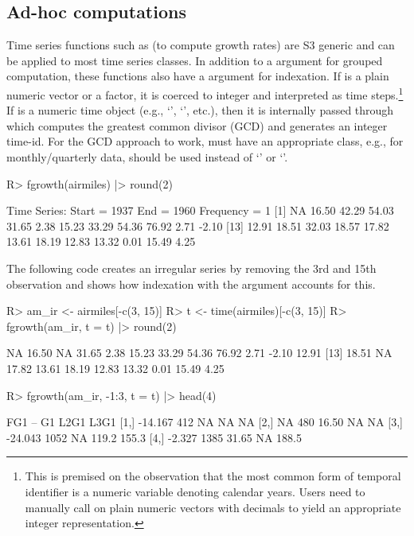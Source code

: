 \documentclass[nojss]{jss} %
\newcommand{\class}[1]{`\code{#1}'}
\newcommand{\fct}[1]{\code{#1()}}
\begin{document}
\subsection{Ad-hoc computations}
%
Time series functions such as \fct{fgrowth} (to compute growth rates) are S3 generic and can be applied to most time series classes. In addition to a  argument for grouped computation, these functions also have a  argument for indexation. If  is a plain numeric vector or a factor, it is coerced to integer and interpreted as time steps.\footnote{This is premised on the observation that the most common form of temporal identifier is a numeric variable denoting calendar years. Users need to manually call  on plain numeric vectors with decimals to yield an appropriate integer representation.} If  is a numeric time object (e.g., \class{Date}, \class{POSIXct}, etc.), then it is internally passed through  which computes the greatest common divisor (GCD) and generates an integer time-id. For the GCD approach to work,  must have an appropriate class, e.g., for monthly/quarterly data,  should be used instead of \class{Date} or \class{POSIXct}. %
%
\begin{Schunk}
\begin{Sinput}
R> fgrowth(airmiles) |> round(2)
\end{Sinput}
\begin{Soutput}
Time Series:
Start = 1937 
End = 1960 
Frequency = 1 
 [1]    NA 16.50 42.29 54.03 31.65  2.38 15.23 33.29 54.36 76.92  2.71 -2.10
[13] 12.91 18.51 32.03 18.57 17.82 13.61 18.19 12.83 13.32  0.01 15.49  4.25
\end{Soutput}
\end{Schunk}
The following code creates an irregular series by removing the 3rd and 15th observation and shows how indexation with the  argument accounts for this.
%
\begin{Schunk}
\begin{Sinput}
R> am_ir <- airmiles[-c(3, 15)]
R> t <- time(airmiles)[-c(3, 15)]
R> fgrowth(am_ir, t = t) |> round(2)
\end{Sinput}
\begin{Soutput}
 [1]    NA 16.50    NA 31.65  2.38 15.23 33.29 54.36 76.92  2.71 -2.10 12.91
[13] 18.51    NA 17.82 13.61 18.19 12.83 13.32  0.01 15.49  4.25
\end{Soutput}
\begin{Sinput}
R> fgrowth(am_ir, -1:3, t = t) |> head(4)
\end{Sinput}
\begin{Soutput}
         FG1   --    G1  L2G1  L3G1
[1,] -14.167  412    NA    NA    NA
[2,]      NA  480 16.50    NA    NA
[3,] -24.043 1052    NA 119.2 155.3
[4,]  -2.327 1385 31.65    NA 188.5
\end{Soutput}
\end{Schunk}
\end{document}
